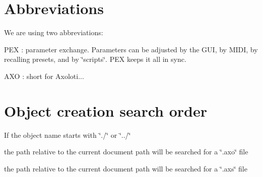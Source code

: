 \hypertarget{developers_developers_abbreviations}{}\section{Abbreviations}\label{developers_developers_abbreviations}
We are using two abbreviations\+: 
\begin{DoxyItemize}
\item P\+EX \+: parameter exchange. Parameters can be adjusted by the G\+UI, by M\+I\+DI, by recalling presets, and by \char`\"{}scripts\char`\"{}. P\+EX keeps it all in sync. 
\item A\+XO \+: short for Axoloti... 
\end{DoxyItemize}\hypertarget{developers_developers_search_order}{}\section{Object creation search order}\label{developers_developers_search_order}
If the object name starts with \char`\"{}./\char`\"{} or \char`\"{}../\char`\"{} 
\begin{DoxyItemize}
\item the path relative to the current document path will be searched for a \char`\"{}.\+axo\char`\"{} file 
\item the path relative to the current document path will be searched for a \char`\"{}.\+axs\char`\"{} file 
\end{DoxyItemize}


